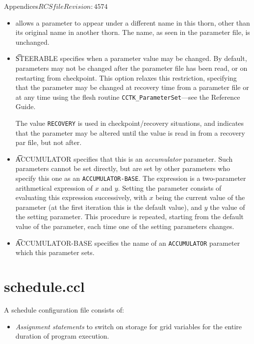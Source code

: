 \begin{cactuspart}{Appendices}{$RCSfile$}{$Revision: 4574 $}
\begin{itemize}
\item
   allows a parameter to appear under a different name in this
  thorn, other than its original name in another thorn.  The name, as seen in
  the parameter file, is unchanged.

\item
  {\t STEERABLE} specifies when a parameter value may be changed.  By
  default, parameters may not be changed after the parameter file has
  been read, or on restarting from checkpoint.  This option relaxes
  this restriction, specifying that the parameter may be changed at
  recovery time from a parameter file or at any time using the flesh
  routine {\tt CCTK\_ParameterSet}---see the Reference Guide.

  The value {\tt RECOVERY} is used in checkpoint/recovery situations,
  and indicates that the parameter may be altered until the value is
  read in from a recovery par file, but not after.

\item
  {\t ACCUMULATOR} specifies that this is an \textit{accumulator}
  parameter.  Such parameters cannot be set directly, but are set by
  other parameters who specify this one as an {\tt ACCUMULATOR-BASE}.
  The expression is a two-parameter arithmetical expression of $x$ and
  $y$.  Setting the parameter consists of evaluating this expression
  successively, with $x$ being the current value of the parameter (at
  the first iteration this is the default value), and $y$ the value of
  the setting parameter.  This procedure is repeated, starting from
  the default value of the parameter, each time one of the setting
  parameters changes.

\item
  {\t ACCUMULATOR-BASE} specifies the name of an {\tt ACCUMULATOR}
  parameter which this parameter sets.

\end{itemize}

\section{schedule.ccl}
\label{sec:Appendix.schedule}

A schedule configuration file consists of:
\begin{itemize}

\item{} \textit{Assignment statements} to switch on storage for
  grid variables for the entire duration of program execution.


\end{itemize}
\end{cactuspart}
